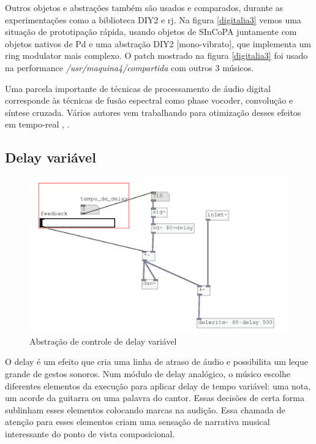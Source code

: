 \documentclass{ppgmus}
\begin{document}
Outros objetos e abstrações também são usados e comparados, durante as experimentações
como a biblioteca DIY2 e rj. Na figura \ref{digitalia3} vemos uma situação de prototipação
rápida, usando objetos de SInCoPA juntamente com objetos nativos de Pd e uma abstração DIY2 [mono-vibrato],
que implementa um ring modulator mais complexo. O patch mostrado na figura \ref{digitalia3} foi usado na
performance \textit{/usr/maquina4/compartida\texttildelow} com outros 3 músicos.

Uma parcela importante de técnicas de processamento de áudio digital corresponde às técnicas
de fusão espectral como phase vocoder, convolução e síntese cruzada. Vários autores vem trabalhando
para otimização desses efeitos em tempo-real \cite{porres}, \cite{pd-tutorial}. 


\subsection{Delay variável}


\begin{figure}
\includegraphics[scale=.6]{sinc-delay}
\caption{Abstração de controle de delay variável}
\label{sinc-delay}
\end{figure}


O delay é um efeito que cria uma linha de atraso de áudio e possibilita
um leque grande de gestos sonoros.
Num módulo  de delay analógico, o músico escolhe diferentes elementos
da execução para aplicar delay de tempo variável: uma nota, um acorde 
da guitarra ou uma palavra do cantor. Essas decisões de certa forma 
sublinham esses elementos colocando marcas na audição. Essa chamada de
atenção para esses elementos criam uma sensação de narrativa musical
interessante do ponto de vista composicional.
\end{document}
